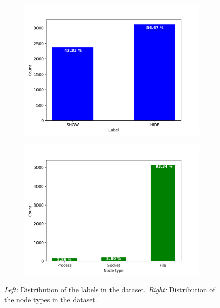 		\begin{figure}[H]
			\centering
			\begin{subfigure}{.45\textwidth}
				\includegraphics[width=\textwidth]{graphics/labels-dist}
			\end{subfigure}
			\hfill
			\begin{subfigure}{.45\textwidth}
				\includegraphics[width=\textwidth]{graphics/node-dist}
			\end{subfigure}
			\caption[Distributions of labels and node type in the dataset]{\textit{Left:} Distribution of the labels in the dataset. \textit{Right: }Distribution of the node types in the dataset.}
			\label{Fig: eval/ml/methodology/dist}
		\end{figure} 
